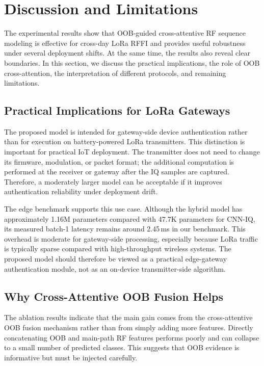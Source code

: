 \section{Discussion and Limitations}
\label{sec:discussion}

The experimental results show that OOB-guided cross-attentive RF sequence modeling is effective for cross-day LoRa RFFI and provides useful robustness under several deployment shifts. At the same time, the results also reveal clear boundaries. In this section, we discuss the practical implications, the role of OOB cross-attention, the interpretation of different protocols, and remaining limitations.

\subsection{Practical Implications for LoRa Gateways}

The proposed model is intended for gateway-side device authentication rather than for execution on battery-powered LoRa transmitters. This distinction is important for practical IoT deployment. The transmitter does not need to change its firmware, modulation, or packet format; the additional computation is performed at the receiver or gateway after the IQ samples are captured. Therefore, a moderately larger model can be acceptable if it improves authentication reliability under deployment drift.

The edge benchmark supports this use case. Although the hybrid model has approximately 1.16M parameters compared with 47.7K parameters for CNN-IQ, its measured batch-1 latency remains around 2.45\,ms in our benchmark. This overhead is moderate for gateway-side processing, especially because LoRa traffic is typically sparse compared with high-throughput wireless systems. The proposed model should therefore be viewed as a practical edge-gateway authentication module, not as an on-device transmitter-side algorithm.

\subsection{Why Cross-Attentive OOB Fusion Helps}

The ablation results indicate that the main gain comes from the cross-attentive OOB fusion mechanism rather than from simply adding more features. Directly concatenating OOB and main-path RF features performs poorly and can collapse to a small number of predicted classes. This suggests that OOB evidence is informative but must be injected carefully.

